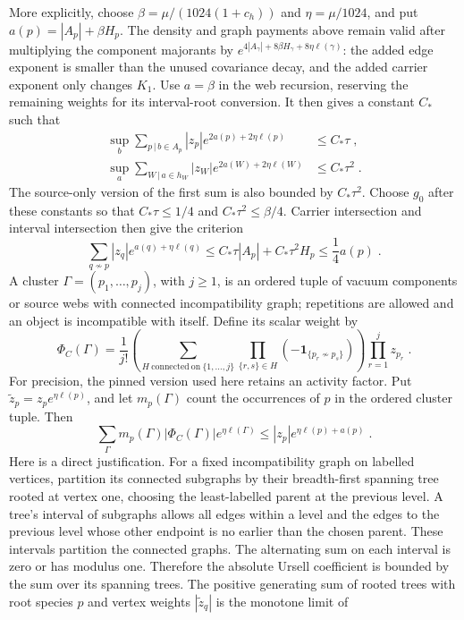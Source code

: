 \documentclass[11pt]{article}
\begin{document}
More explicitly, choose $\beta=\mu/(1024(1+c_h))$ and $\eta=\mu/1024$, and put $a(p)=|A_p|+\beta H_p$. The density and graph payments above remain valid after multiplying the component majorants by $e^{4|A_\gamma|+8\beta H_\gamma+8\eta\ell(\gamma)}$: the added edge exponent is smaller than the unused covariance decay, and the added carrier exponent only changes $K_1$. Use $a=\beta$ in the web recursion, reserving the remaining weights for its interval-root conversion. It then gives a constant $C_*$ such that
\begin{equation}\label{eq:marginal-weighted-loads}
    \begin{aligned}
        \sup_b\sum_{p\, | \,b\in A_p}
            |z_p|e^{2a(p)+2\eta\ell(p)}&\leq C_*\tau\;,\\
        \sup_a\sum_{W\, | \,a\in h_W}
            |z_W|e^{2a(W)+2\eta\ell(W)}&\leq C_*\tau^2\;.
    \end{aligned}
\end{equation}
The source-only version of the first sum is also bounded by $C_*\tau^2$. Choose $g_0$ after these constants so that $C_*\tau\leq 1/4$ and $C_*\tau^2\leq \beta/4$. Carrier intersection and interval intersection then give the criterion
\begin{equation}\label{eq:marginal-KP-payment}
    \sum_{q\not \sim p}|z_q|e^{a(q)+\eta\ell(q)}
        \leq C_*\tau|A_p|+C_*\tau^2H_p
        \leq \frac{1}{4}a(p)\;.
\end{equation}
A cluster $\Gamma=(p_1,\ldots,p_j)$, with $j\geq 1$, is an ordered tuple of vacuum components or source webs with connected incompatibility graph; repetitions are allowed and an object is incompatible with itself. Define its scalar weight by
\begin{equation}\label{eq:marginal-cluster-weight}
    \Phi_C(\Gamma)=\frac{1}{j!}
        \left(\sum_{H\ \mathrm{connected\ on}\ \{1,\ldots,j\}}
            \prod_{\{r,s\}\in H}(-\mathbf1_{\{p_r\not \sim p_s\}})\right)
        \prod_{r=1}^j z_{p_r}\;.
\end{equation}
For precision, the pinned version used here retains an activity factor. Put $\widetilde z_p=z_pe^{\eta\ell(p)}$, and let $m_p(\Gamma)$ count the occurrences of $p$ in the ordered cluster tuple. Then
\begin{equation}\label{eq:marginal-pinned-bound}
    \sum_\Gamma m_p(\Gamma)|\Phi_C(\Gamma)|e^{\eta\ell(\Gamma)}
        \leq |z_p|e^{\eta\ell(p)+a(p)}\;.
\end{equation}
Here is a direct justification. For a fixed incompatibility graph on labelled vertices, partition its connected subgraphs by their breadth-first spanning tree rooted at vertex one, choosing the least-labelled parent at the previous level. A tree's interval of subgraphs allows all edges within a level and the edges to the previous level whose other endpoint is no earlier than the chosen parent. These intervals partition the connected graphs. The alternating sum on each interval is zero or has modulus one. Therefore the absolute Ursell coefficient is bounded by the sum over its spanning trees. The positive generating sum of rooted trees with root species $p$ and vertex weights $|\widetilde z_q|$ is the monotone limit of
\end{document}
